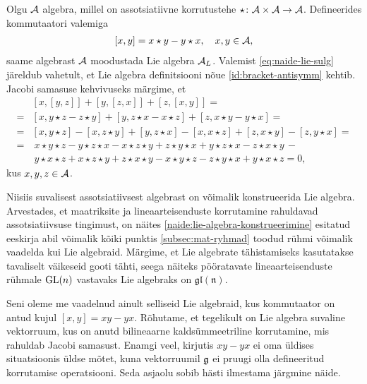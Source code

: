 \begin{naide}\label{naide:lie-algebra-konstrueerimine}
    Olgu $\mathcal{A}$ algebra, millel on assotsiatiivne korrutustehe
    $\star \colon \mathcal{A} \times \mathcal{A} \to \mathcal{A}$. Defineerides kommutaatori valemiga
    \begin{align}\label{eq:naide-lie-sulg}
        [x, y] = x \star y - y \star x,\quad x, y \in \mathcal{A},
    \end{align}
    saame algebrast $\mathcal{A}$ moodustada Lie algebra $\mathcal{A}_L$. Valemist
    \eqref{eq:naide-lie-sulg} järeldub vahetult, et Lie algebra
    definitsiooni nõue \eqref{id:bracket-antisymm} kehtib. Jacobi samasuse
    kehvivuseks märgime, et
    \begin{align*}
        &\left[x, \left[y, z\right]\right] + 
            \left[y, \left[z, x\right]\right] + 
            \left[z, \left[x, y\right]\right] = \\
        =& \left[x, y \star z - z \star y \right] + 
            \left[y, z \star x - x \star z \right] + 
            \left[z, x \star y - y \star x \right] = \\
        =& \left[x, y \star z\right] - \left[x, z \star y\right] + 
            \left[y, z \star x\right] - \left[x, x \star z\right] + 
            \left[z, x \star y\right] - \left[z, y \star x\right] = \\
        =&\ x \star y \star z - y \star z \star x - x \star z \star y +
            z \star y \star x + y \star z \star x - z \star x \star y\, - \\
         &\ y \star x \star z + x \star z \star y + z \star x \star y -
            x \star y \star z - z \star y \star x + y \star x \star z = 0,
    \end{align*}
    kus $x, y, z \in \mathcal{A}$.
\end{naide}

Niisiis suvalisest assotsiatiivsest algebrast on võimalik konstrueerida
Lie algebra. Arvestades, et maatriksite ja lineaarteisenduste korrutamine
rahuldavad assotsiatiivsuse tingimust, on näites
\ref{naide:lie-algebra-konstrueerimine} esitatud eeskirja abil
võimalik kõiki punktis \ref{subsec:mat-ryhmad} toodud
rühmi võimalik vaadelda kui Lie algebraid. Märgime, et Lie algebrate
tähistamiseks kasutatakse tavaliselt väikeseid gooti tähti, seega näiteks
pööratavate lineaarteisenduste rühmale $\operatorname{GL}(n)$ vastavaks Lie algebraks on
$\mathfrak{gl(n)}$.

Seni oleme me vaadelnud ainult selliseid Lie algebraid, kus kommutaator
on antud kujul $[x, y] = xy - yx$. Rõhutame, et tegelikult on Lie algebra
suvaline vektorruum, kus on anutd bilineaarne kaldsümmeetriline korrutamine,
mis rahuldab Jacobi samasust. Enamgi veel, kirjutis $xy - yx$ ei oma üldises
situatsioonis üldse mõtet, kuna vektorruumil $\mathfrak{g}$ ei pruugi olla defineeritud
korrutamise operatsiooni. Seda asjaolu sobib hästi ilmestama järgmine näide.

